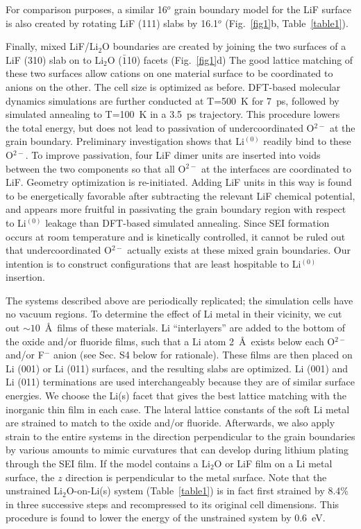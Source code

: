 \documentclass[prb,preprint,amsmath,amssymb]{revtex4}
\begin{document}
For comparison purposes, a similar 16$^o$ grain boundary model for the
LiF surface is also created by rotating LiF (111) slabs by 16.1$^o$
(Fig.~\ref{fig1}b, Table~\ref{table1}).

Finally, mixed LiF/Li$_2$O boundaries are created by joining the two surfaces
of a LiF (310) slab on to Li$_2$O ($\bar{1}$10) facets (Fig.~\ref{fig1}d)
The good lattice matching of these two surfaces
allow cations on one material surface to be coordinated to anions on the
other.  The cell size is optimized as before.  DFT-based molecular dynamics
simulations are further conducted at T=500~K for 7~ps, followed by simulated
annealing to T=100~K in a 3.5~ps trajectory.  This procedure lowers the total
energy, but does not lead to passivation of undercoordinated O$^{2-}$ at
the grain boundary.  Preliminary investigation shows that Li$^{(0)}$ readily
bind to these O$^{2-}$.  To improve passivation,
four LiF dimer units are inserted into voids between the two components so
that all O$^{2-}$ at the interfaces are coordinated to LiF.  Geometry
optimization is re-initiated.  Adding LiF units in this way is found to be
energetically favorable after subtracting the relevant LiF chemical potential,
and appears more fruitful in passivating the grain boundary region with
respect to Li$^{(0)}$ leakage than DFT-based simulated annealing.  
Since SEI formation occurs at room temperature and is kinetically controlled,
it cannot be ruled out that undercoordinated O$^{2-}$ actually exists
at these mixed grain boundaries. Our intention is to construct configurations
that are least hospitable to Li$^{(0)}$ insertion.

The systems described above are periodically replicated; the simulation
cells have no vacuum regions.  To determine the effect of Li metal in their
vicinity, we cut out $\sim 10$~\AA\, films of these materials.
Li ``interlayers'' are added to the bottom of the oxide and/or fluoride films,
such that a Li atom 2~\AA\, exists below each O$^{2-}$ and/or F$^-$ anion
(see Sec. S4 below for rationale).  These films are then placed on Li (001)
or Li (011) surfaces, and the resulting slabs are optimized.  Li (001) and
Li (011) terminations are used interchangeably because they are of similar
surface energies.\cite{holzwarth} We choose the Li(s) facet that gives the
best lattice matching with the inorganic thin film in each case.  The lateral
lattice constants of the soft Li metal are strained to match to the oxide
and/or fluoride.  Afterwards, we also apply strain to the entire systems in
the direction perpendicular to the grain boundaries by various amounts to
mimic curvatures that can develop during lithium plating through the SEI film.
If the model contains a Li$_2$O or LiF film on a Li metal surface, the $z$
direction is perpendicular to the metal surface.  Note that the unstrained
Li$_2$O-on-Li(s) system (Table~\ref{table1}) is in fact first strained by
8.4\% in three successive steps and recompressed to its original cell
dimensions.  This procedure is found to lower the energy of the unstrained
system by 0.6~eV.
\end{document}
